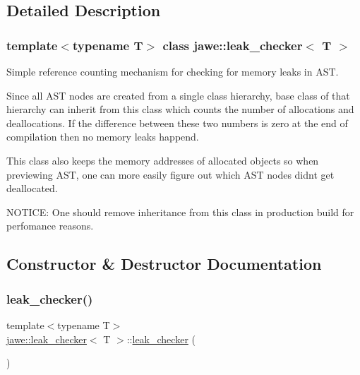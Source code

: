 \subsection{Detailed Description}
\subsubsection*{template$<$typename T$>$\newline
class jawe\+::leak\+\_\+checker$<$ T $>$}

Simple reference counting mechanism for checking for memory leaks in A\+ST. 

Since all A\+ST nodes are created from a single class hierarchy, base class of that hierarchy can inherit from this class which counts the number of allocations and deallocations. If the difference between these two numbers is zero at the end of compilation then no memory leaks happend.

This class also keeps the memory addresses of allocated objects so when previewing A\+ST, one can more easily figure out which A\+ST nodes didn\textquotesingle{}t get deallocated.

N\+O\+T\+I\+CE\+: One should remove inheritance from this class in production build for perfomance reasons. 

\subsection{Constructor \& Destructor Documentation}
\mbox{\label{classjawe_1_1leak__checker_aafd2dc6d0312976fa99fd4b4f364ff8f}} 
\subsubsection{\texorpdfstring{leak\+\_\+checker()}{leak\_checker()}}
{\footnotesize\ttfamily template$<$typename T$>$ \\
\hyperlink{classjawe_1_1leak__checker}{jawe\+::leak\+\_\+checker}$<$ T $>$\+::\hyperlink{classjawe_1_1leak__checker}{leak\+\_\+checker} (\begin{DoxyParamCaption}{ }\end{DoxyParamCaption})\hspace{0.3cm}{\ttfamily [inline]}}

